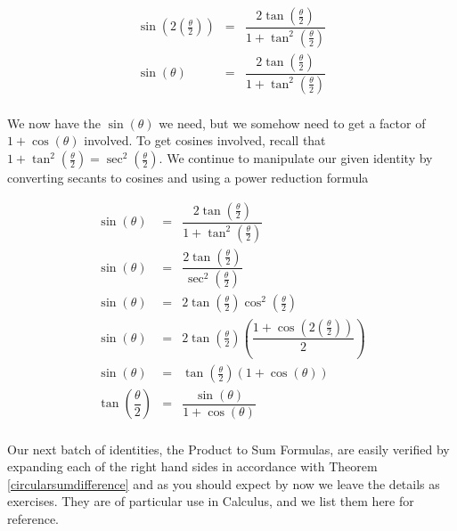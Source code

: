 {\begin{enumerate}
\[ \begin{array}{rcl} 

\sin\left(2 \left(\frac{\theta}{2}\right)\right) & = &  \dfrac{2\tan\left(\frac{\theta}{2}\right)}{1 + \tan^{2}\left(\frac{\theta}{2}\right)} \\ [15pt]
\sin(\theta) & = & \dfrac{2\tan\left(\frac{\theta}{2}\right)}{1 + \tan^{2}\left(\frac{\theta}{2}\right)} \\ \end{array} \]

\enlargethispage{2\baselineskip}
We now have the $\sin(\theta)$ we need, but we somehow need to get a factor of $1+\cos(\theta)$ involved.  To get cosines involved, recall that $1 + \tan^{2}\left(\frac{\theta}{2}\right) = \sec^{2}\left(\frac{\theta}{2}\right)$.  We continue to manipulate our given identity by converting secants to cosines and using a power reduction formula

\[ \begin{array}{rcl} 

\sin(\theta) & = &  \dfrac{2\tan\left(\frac{\theta}{2}\right)}{1 + \tan^{2}\left(\frac{\theta}{2}\right)} \\ [15pt]
\sin(\theta) & = & \dfrac{2\tan\left(\frac{\theta}{2}\right)}{\sec^{2}\left(\frac{\theta}{2}\right)} \\ [15pt]
\sin(\theta) & = & 2 \tan\left(\frac{\theta}{2}\right) \cos^{2}\left(\frac{\theta}{2}\right) \\ [5pt]
\sin(\theta) & = & 2 \tan\left(\frac{\theta}{2}\right) \left(\dfrac{1 + \cos\left(2 \left(\frac{\theta}{2}\right)\right)}{2}\right) \\ [15pt]
\sin(\theta) & = &  \tan\left(\frac{\theta}{2}\right) \left(1+\cos(\theta) \right) \\ [5pt]
\tan\left(\dfrac{\theta}{2}\right) & = & \dfrac{\sin(\theta)}{1+\cos(\theta)} \\ 
\end{array}  \]

\end{enumerate}
}

\pagebreak

Our next batch of identities, the Product to Sum Formulas, are easily verified by expanding each of the right hand sides in accordance with Theorem \ref{circularsumdifference} and as you should expect by now we leave the details as exercises.  They are of particular use in Calculus, and we list them here for reference.


